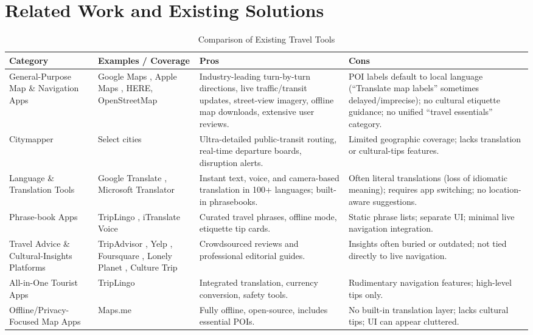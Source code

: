 \begin{sloppypar}
\section{Related Work and Existing Solutions}
\begin{table}[H]
  \centering
  \caption{Comparison of Existing Travel Tools}
  \label{tab:travel-tools-comparison}
  \begin{tabular}{|p{3cm}|p{3cm}|p{4cm}|p{4cm}|}
    \hline
    \textbf{Category} & \textbf{Examples / Coverage} & \textbf{Pros} & \textbf{Cons} \\ 
    \hline
    General-Purpose Map \& Navigation Apps &
      Google Maps \cite{googlemaps}, Apple Maps \cite{applemaps}, HERE\cite{herewego}, OpenStreetMap\cite{openstreetmap} &
      Industry-leading turn-by-turn directions, live traffic/transit updates, street-view imagery, offline map downloads, extensive user reviews. &
      POI labels default to local language (“Translate map labels” sometimes delayed/imprecise); no cultural etiquette guidance; no unified “travel essentials” category. \\
    \hline
    Citymapper &
      Select cities \cite{citymapper} &
      Ultra-detailed public-transit routing, real-time departure boards, disruption alerts. &
      Limited geographic coverage; lacks translation or cultural-tips features. \\
    \hline
    Language \& Translation Tools &
      Google Translate \cite{googlet}, Microsoft Translator \cite{mstranslator} &
      Instant text, voice, and camera-based translation in 100+ languages; built-in phrasebooks. &
      Often literal translations (loss of idiomatic meaning); requires app switching; no location-aware suggestions. \\
    \hline
    Phrase-book Apps &
      TripLingo \cite{triplingo}, iTranslate Voice \cite{itranslate} &
      Curated travel phrases, offline mode, etiquette tip cards. &
      Static phrase lists; separate UI; minimal live navigation integration. \\
    \hline
    Travel Advice \& Cultural-Insights Platforms &
      TripAdvisor \cite{tripadvisor}, Yelp \cite{yelp}, Foursquare \cite{foursquare}, Lonely Planet \cite{lonelyplanet}, Culture Trip \cite{culturetrip} &
      Crowdsourced reviews and professional editorial guides. &
      Insights often buried or outdated; not tied directly to live navigation. \\
    \hline
    All-in-One Tourist Apps &
      TripLingo \cite{triplingo} &
      Integrated translation, currency conversion, safety tools. &
      Rudimentary navigation features; high-level tips only. \\
    \hline
    Offline/Privacy-Focused Map Apps &
      Maps.me \cite{mapsme} &
      Fully offline, open-source, includes essential POIs. &
      No built-in translation layer; lacks cultural tips; UI can appear cluttered. \\
    \hline
  \end{tabular}
\end{table}

\end{sloppypar}
